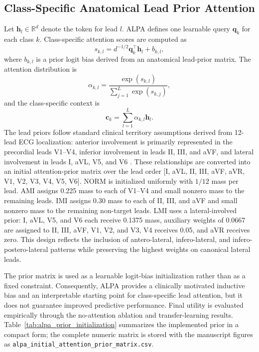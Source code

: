 \documentclass[a4paper,fleqn]{cas-dc}
\begin{document}
\subsection{Class-Specific Anatomical Lead Prior Attention}
Let $\mathbf{h}_l\in\mathbb{R}^{d}$ denote the token for lead $l$. ALPA defines one learnable query
$\mathbf{q}_k$ for each class $k$. Class-specific attention scores are computed as
\begin{equation}
s_{k,l}=d^{-1/2}\mathbf{q}_k^{\top}\mathbf{h}_l + b_{k,l},
\label{eq:lwca_descriptor}
\end{equation}
where $b_{k,l}$ is a prior logit bias derived from an anatomical lead-prior matrix. The attention
distribution is
\begin{equation}
\alpha_{k,l}=\frac{\exp(s_{k,l})}{\sum_{j=1}^{L}\exp(s_{k,j})},
\label{eq:lwca_softmax}
\end{equation}
and the class-specific context is
\begin{equation}
\mathbf{c}_k=\sum_{l=1}^{L}\alpha_{k,l}\mathbf{h}_l.
\label{eq:lwca_scale}
\end{equation}
The lead priors follow standard clinical territory assumptions derived from 12-lead ECG
localization: anterior involvement is primarily represented in the precordial leads V1--V4, inferior
involvement in leads II, III, and aVF, and lateral involvement in leads I, aVL, V5, and V6
\cite{Ludhwani2024LateralWallMI,Thygesen2018FourthUniversalMI}. These relationships are converted
into an initial attention-prior matrix over the lead order [I, aVL, II, III, aVF, aVR, V1, V2, V3,
V4, V5, V6]. NORM is initialized uniformly with $1/12$ mass per lead. AMI assigns 0.225 mass to each
of V1--V4 and small nonzero mass to the remaining leads. IMI assigns 0.30 mass to each of II, III,
and aVF and small nonzero mass to the remaining non-target leads. LMI uses a lateral-involved prior:
I, aVL, V5, and V6 each receive 0.1375 mass, auxiliary weights of 0.0667 are assigned to II, III,
aVF, V1, V2, and V3, V4 receives 0.05, and aVR receives zero. This design reflects the inclusion of
antero-lateral, infero-lateral, and infero-postero-lateral patterns while preserving the highest
weights on canonical lateral leads.

The prior matrix is used as a learnable logit-bias initialization rather than as a fixed constraint.
Consequently, ALPA provides a clinically motivated inductive bias and an interpretable starting
point for class-specific lead attention, but it does not guarantee improved predictive performance.
Final utility is evaluated empirically through the no-attention ablation and transfer-learning
results. Table~\ref{tab:alpa_prior_initialization} summarizes the implemented prior in a compact
form; the complete numeric matrix is stored with the manuscript figures as
\texttt{alpa\_initial\_attention\_prior\_matrix.csv}.
\end{document}
